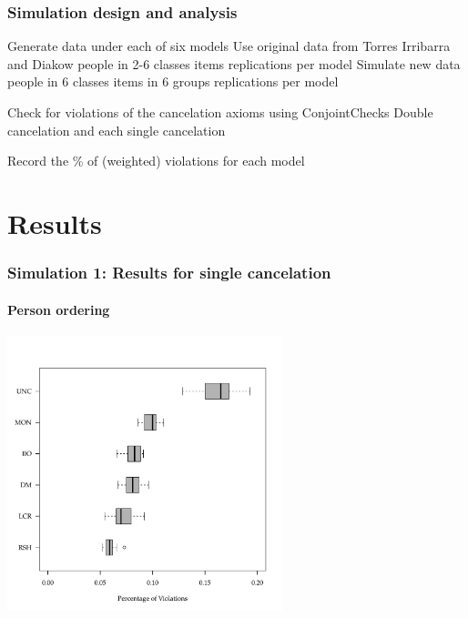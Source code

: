 \documentclass[10pt,serif,professionalfont]{beamer}
\begin{document}
\begin{frame}
    \frametitle{Simulation design and analysis}

        \begin{outline}
        \1 Generate data under each of six models
        \renewcommand{\outlineii}{enumerate}
            \2 Use original data from Torres Irribarra and Diakow
                 people in 2-6 classes
                 items
                 replications per model
            \2 Simulate new data
                 people in 6 classes
                 items in 6 groups
                 replications per model

        \vspace{0.25cm}

        \1 Check for violations of the cancelation axioms using ConjointChecks
        \renewcommand{\outlineii}{itemize}
            \2 Double cancelation and each single cancelation

        \vspace{0.25cm}

        \1 Record the \% of (weighted) violations for each model
    \end{outline}

\end{frame}


\section{Results}

\begin{frame}
    \frametitle{Simulation 1: Results for single cancelation}
        \framesubtitle{Person ordering}

    \centering \includegraphics[width=0.6\textwidth]{./figs/sc_cols.pdf}

\end{frame}
\end{document}
